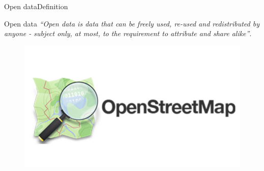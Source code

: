 \begin{frame}{Open data}{Definition}
    \begin{block}{Open data}
        \textit{``Open data is data that can be freely used, re-used and redistributed by anyone - subject only, at most, to the requirement to attribute and share alike''}.
    \end{block}
    \pause
    \begin{figure}
        \centering
        \includegraphics[width=.6\textwidth,height=.4\textwidth]{img/OSM.png}
    \end{figure}
\end{frame}

